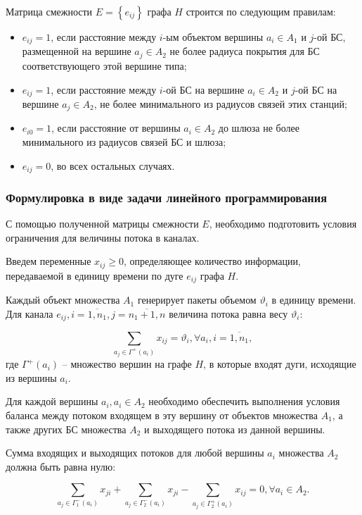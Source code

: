 Матрица смежности $E = \left\{ e_{ij} \right\}$ графа $H$ строится по следующим правилам:

\begin{itemize}
    \item $e_{ij} = 1$, если расстояние между $i$-ым объектом вершины $a_i \in A_1$ и $j$-ой БС, размещенной на вершине $a_j \in A_2$ не более радиуса покрытия для БС соответствующего этой вершине типа; 
    \item $e_{ij} = 1$, если расстояние между $i$-ой БС на вершине $a_i \in A_2$ и $j$-ой БС на вершине $a_j \in A_2$, не более минимального из радиусов связей этих станций;
    \item $e_{i0} = 1$, если расстояние от вершины $a_i \in A_2$ до шлюза не более минимального из радиусов связей БС и шлюза;
    \item $e_{ij} = 0$, во всех остальных случаях.
\end{itemize}

\subsubsection{Формулировка в виде задачи линейного программирования}
С помощью полученной матрицы смежности $E$, необходимо подготовить условия ограничения для величины потока в каналах.

Введем переменные $x_{ij} \geqslant 0$, определяющее количество информации, передаваемой в единицу времени по дуге $e_{ij}$ графа $H$.

Каждый объект множества $A_1$ генерирует пакеты объемом $\vartheta_i$ в единицу времени. Для канала $e_{ij}, i = \overline{1,n_1}, j = \overline{n_1+1,n}$ величина потока равна весу $\vartheta_i$:

\begin{equation}\label{eq:part2_1.1}
    \sum_{a_j \in \Gamma^+(a_i)} x_{ij} = \vartheta_i, \forall a_i, i=\overline{1, n_1},
\end{equation}
где $\Gamma^+(a_i)$ – множество вершин на графе $H$, в которые входят дуги, исходящие из вершины $a_i$. 

Для каждой вершины $a_i,  a_i \in A_2$ необходимо обеспечить выполнения условия баланса между потоком входящем в эту вершину от объектов множества $A_1$, а также других БС множества $A_2$ и выходящего потока из данной вершины. 

Сумма входящих и выходящих потоков для любой вершины $a_i$  множества $A_2$ должна быть равна нулю:

\begin{equation}\label{eq:part2_1.2}
    \sum_{a_j \in \Gamma_1^-(a_i)} x_{ji} + \sum_{a_j \in \Gamma_2^-(a_i)} x_{ji} -  \sum_{a_j \in \Gamma_2^+(a_i)} x_{ij} =0 ,\forall a_i \in A_2. 
\end{equation}


